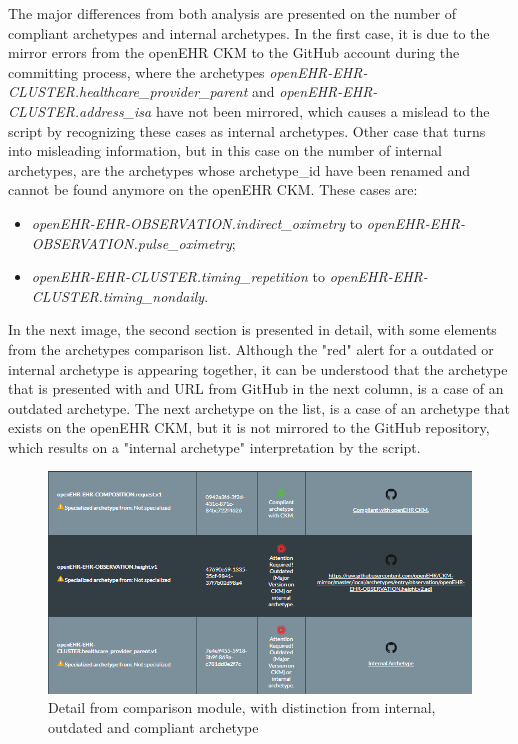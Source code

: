 \documentclass[mim_thesis.tex]{subfiles}
\begin{document}
The major differences from both analysis are presented on the number of compliant archetypes and internal archetypes. In the first case, it is due to the mirror errors from the openEHR CKM to the GitHub account during the committing process, where the archetypes \textit{openEHR-EHR-CLUSTER.healthcare\_provider\_parent} and \textit{openEHR-EHR-CLUSTER.address\_isa} have not been mirrored, which causes a mislead to the script by recognizing these cases as internal archetypes. Other case that turns into misleading information, but in this case on the number of internal archetypes, are the archetypes whose archetype\_id have been renamed and cannot be found anymore on the openEHR CKM. These cases are:

\begin{itemize}
\item \textit{openEHR-EHR-OBSERVATION.indirect\_oximetry} to \textit{openEHR-EHR-OBSERVATION.pulse\_oximetry};
\item \textit{openEHR-EHR-CLUSTER.timing\_repetition} to \textit{openEHR-EHR-CLUSTER.timing\_nondaily}.
\end{itemize}

In the next image, the second section is presented in detail, with some elements from the archetypes comparison list. Although the "red" alert for a outdated or internal archetype is appearing together, it can be understood that the archetype that is presented with and URL from GitHub in the next column, is a case of an outdated archetype. The next archetype on the list, is a case of an archetype that exists on the openEHR CKM, but it is not mirrored to the GitHub repository, which results on a "internal archetype" interpretation by the script.

\begin{figure}[H]
	\centering
    \includegraphics[width=1\textwidth]{img/arch_comparison_2.PNG}
	\caption{Detail from comparison module, with distinction from internal, outdated and compliant archetype}
	\label{fig:arch_comparison_2}
\end{figure}
\end{document}

